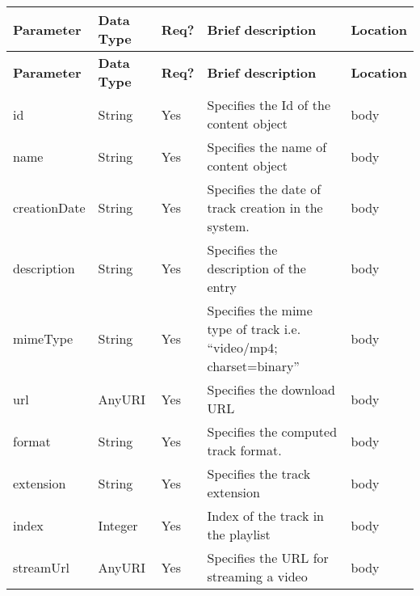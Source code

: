 {\footnotesize{}}%
\begin{longtable}{|>{\raggedright}p{}|>{\raggedright}p{}|>{\raggedright}p{}|>{\raggedright}p{}|>{\raggedright}p{}|}
\hline
\hline 
\textbf{\footnotesize{Parameter }} & \textbf{\footnotesize{Data Type}} & \textbf{\footnotesize{Req?}} & \textbf{\footnotesize{Brief description}} & \textbf{\footnotesize{Location}}\tabularnewline
\hline 
\hline
\endfirsthead
\hline
\hline 
\textbf{\footnotesize{Parameter }} & \textbf{\footnotesize{Data Type}} & \textbf{\footnotesize{Req?}} & \textbf{\footnotesize{Brief description}} & \textbf{\footnotesize{Location}}\tabularnewline
\hline 
\hline
\endhead
\hline 
{\footnotesize{id}} & {\footnotesize{String}} & {\footnotesize{Yes}} & {\footnotesize{Specifies the Id of the content object}} & {\footnotesize{body}}\tabularnewline
\hline 
{\footnotesize{name}} & {\footnotesize{String}} & {\footnotesize{Yes}} & {\footnotesize{Specifies the name of content object}} & {\footnotesize{body}}\tabularnewline
\hline 
{\footnotesize{creationDate}} & {\footnotesize{String}} & {\footnotesize{Yes}} & {\footnotesize{Specifies the date of track creation in the system.}} & {\footnotesize{body}}\tabularnewline
\hline 
{\footnotesize{description}} & {\footnotesize{String}} & {\footnotesize{Yes}} & {\footnotesize{Specifies the description of the entry}} & {\footnotesize{body}}\tabularnewline
\hline 
{\footnotesize{mimeType}} & {\footnotesize{String}} & {\footnotesize{Yes}} & {\footnotesize{Specifies the mime type of track i.e. “video/mp4; charset=binary”}} & {\footnotesize{body}}\tabularnewline
\hline 
{\footnotesize{url}} & {\footnotesize{AnyURI}} & {\footnotesize{Yes}} & {\footnotesize{Specifies the download URL}} & {\footnotesize{body}}\tabularnewline
\hline 
{\footnotesize{format}} & {\footnotesize{String}} & {\footnotesize{Yes}} & {\footnotesize{Specifies the computed track format. }} & {\footnotesize{body}}\tabularnewline
\hline 
{\footnotesize{extension}} & {\footnotesize{String}} & {\footnotesize{Yes}} & {\footnotesize{Specifies the track extension}} & {\footnotesize{body}}\tabularnewline
\hline 
{\footnotesize{index}} & {\footnotesize{Integer}} & {\footnotesize{Yes}} & {\footnotesize{Index of the track in the playlist}} & {\footnotesize{body}}\tabularnewline
\hline 
{\footnotesize{streamUrl}}%
\begin{comment}
{\footnotesize{Is streaming supported in this version???}}
\end{comment}
{} & {\footnotesize{AnyURI}} & {\footnotesize{Yes}} & {\footnotesize{Specifies the URL for streaming a video}} & {\footnotesize{body}}\tabularnewline

\end{longtable}
